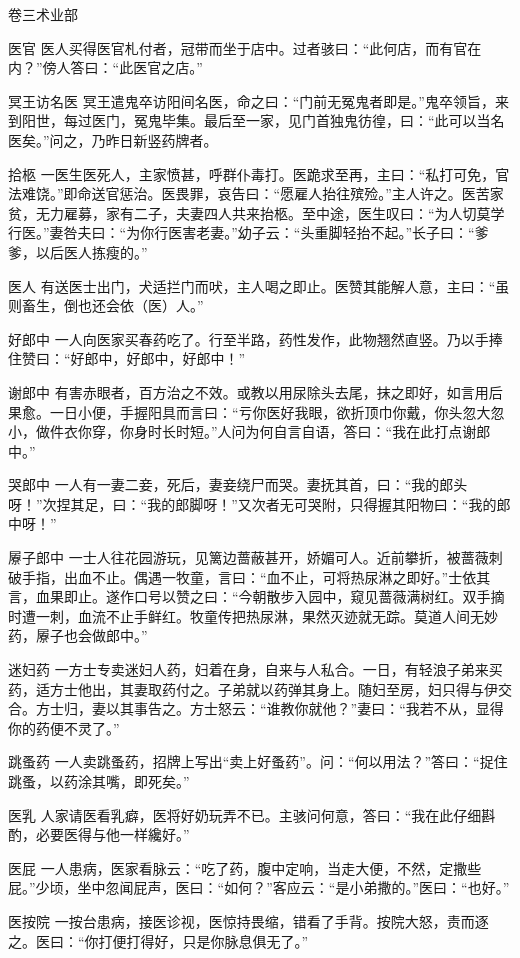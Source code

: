 \documentclass[12pt,UTF8]{ctexbook}
\begin{document}
卷三术业部

医官
医人买得医官札付者，冠带而坐于店中。过者骇曰：“此何店，而有官在内？”傍人答曰：“此医官之店。”

冥王访名医
冥王遣鬼卒访阳间名医，命之曰：“门前无冤鬼者即是。”鬼卒领旨，来到阳世，每过医门，冤鬼毕集。最后至一家，见门首独鬼彷徨，曰：“此可以当名医矣。”问之，乃昨日新竖药牌者。

拾柩
一医生医死人，主家愤甚，呼群仆毒打。医跪求至再，主曰：“私打可免，官法难饶。”即命送官惩治。医畏罪，哀告曰：“愿雇人抬往殡殓。”主人许之。医苦家贫，无力雇募，家有二子，夫妻四人共来抬柩。至中途，医生叹曰：“为人切莫学行医。”妻咎夫曰：“为你行医害老妻。”幼子云：“头重脚轻抬不起。”长子曰：“爹爹，以后医人拣瘦的。”

医人
有送医士出门，犬适拦门而吠，主人喝之即止。医赞其能解人意，主曰：“虽则畜生，倒也还会依（医）人。”

好郎中
一人向医家买春药吃了。行至半路，药性发作，此物翘然直竖。乃以手捧住赞曰：“好郎中，好郎中，好郎中！”

谢郎中
有害赤眼者，百方治之不效。或教以用尿除头去尾，抹之即好，如言用后果愈。一日小便，手握阳具而言曰：“亏你医好我眼，欲折顶巾你戴，你头忽大忽小，做件衣你穿，你身时长时短。”人问为何自言自语，答曰：“我在此打点谢郎中。”

哭郎中
一人有一妻二妾，死后，妻妾绕尸而哭。妻抚其首，曰：“我的郎头呀！”次捏其足，曰：“我的郎脚呀！”又次者无可哭附，只得握其阳物曰：“我的郎中呀！”

屪子郎中
一士人往花园游玩，见篱边蔷蔽甚开，娇媚可人。近前攀折，被蔷薇刺破手指，出血不止。偶遇一牧童，言曰：“血不止，可将热尿淋之即好。”士依其言，血果即止。遂作口号以赞之曰：“今朝散步入园中，窥见蔷薇满树红。双手摘时遭一刺，血流不止手鲜红。牧童传把热尿淋，果然灭迹就无踪。莫道人间无妙药，屪子也会做郎中。”

迷妇药
一方士专卖迷妇人药，妇着在身，自来与人私合。一日，有轻浪子弟来买药，适方士他出，其妻取药付之。子弟就以药弹其身上。随妇至房，妇只得与伊交合。方士归，妻以其事告之。方士怒云：“谁教你就他？”妻曰：“我若不从，显得你的药便不灵了。”

跳蚤药
一人卖跳蚤药，招牌上写出“卖上好蚤药”。问：“何以用法？”答曰：“捉住跳蚤，以药涂其嘴，即死矣。”

医乳
人家请医看乳癖，医将好奶玩弄不已。主骇问何意，答曰：“我在此仔细斟酌，必要医得与他一样纔好。”

医屁
一人患病，医家看脉云：“吃了药，腹中定响，当走大便，不然，定撒些屁。”少顷，坐中忽闻屁声，医曰：“如何？”客应云：“是小弟撒的。”医曰：“也好。”

医按院
一按台患病，接医诊视，医惊持畏缩，错看了手背。按院大怒，责而逐之。医曰：“你打便打得好，只是你脉息俱无了。”
\end{document}

